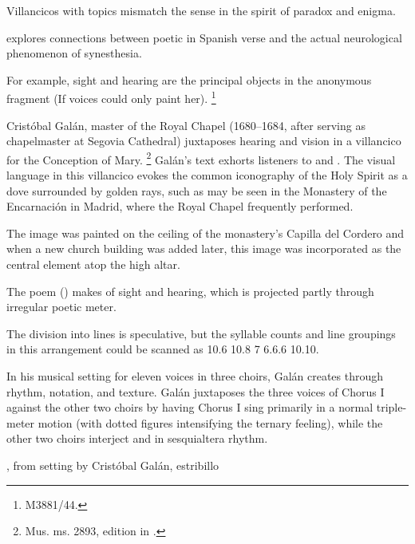 Villancicos with  topics mismatch the sense in the spirit of paradox and enigma.%
\begin{Footnote}
    \Autocite{DoetschKraus:Sinestesia} explores connections between poetic  in Spanish verse and the actual neurological phenomenon of synesthesia.
\end{Footnote}
For example, sight and hearing are the principal objects in the anonymous fragment  (If voices could only paint her).%
\footnote{\signature{E-Mn}{M3881/44}.}

Cristóbal Galán, master of the Royal Chapel (1680--1684, after serving as chapelmaster at Segovia Cathedral) juxtaposes hearing and vision in a villancico for the Conception of Mary.%
    \footnote{\signature{D-Mbs}{Mus. ms. 2893}, edition in \autocite[567--568]{CaberoPueyo:PhD}.}
Galán's text exhorts listeners to  and .
The visual language in this villancico evokes the common iconography of the Holy Spirit as a dove surrounded by golden rays, such as may be seen in the Monastery of the Encarnación in Madrid, where the Royal Chapel frequently performed.%
\begin{Footnote}
    The image was painted on the ceiling of the monastery's Capilla del Cordero and when a new church building was added later, this image was incorporated as the central element atop the high altar.%
    \Autocite[69--70, 81]{Sanz:GuiaDescalzasEncarnacion}
\end{Footnote}

The poem () makes  of sight and hearing, which is projected partly through irregular poetic meter.%
\begin{Footnote}
    The division into lines is speculative, but the syllable counts and line groupings in this arrangement could be scanned as 10.6 10.8 7 6.6.6 10.10.
\end{Footnote}
In his musical setting for eleven voices in three choirs, Galán creates  through rhythm, notation, and texture.
Galán juxtaposes the three voices of Chorus I against the other two choirs by having Chorus I sing primarily in a normal triple-meter motion (with dotted figures intensifying the ternary feeling), while the other two choirs interject  and  in sesquialtera rhythm.

\begin{expoem}
    \caption{, from setting by Cristóbal Galán, estribillo}
    \label{expoem:Oigan_todos_del_ave-Galan}
\end{expoem}

